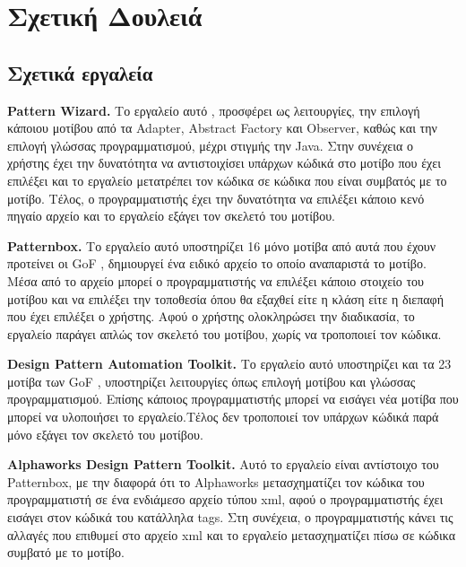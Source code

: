\chapter{Σχετική Δουλειά}
\label{ch:relativeWork}
\section{Σχετικά εργαλεία}
\label{sec:relativeTools}
\textbf{Pattern Wizard.} Το εργαλείο αυτό \cite{PatternBox}, προσφέρει ως λειτουργίες, την επιλογή κάποιου μοτίβου 
από τα Adapter, Abstract Factory και Observer, καθώς και την επιλογή γλώσσας προγραμματισμού, μέχρι στιγμής την Java. Στην συνέχεια 
ο χρήστης έχει την δυνατότητα να αντιστοιχίσει υπάρχων κώδικά στο μοτίβο που έχει επιλέξει και το εργαλείο μετατρέπει τον κώδικα 
σε κώδικα που είναι συμβατός με το μοτίβο. Τέλος, ο προγραμματιστής έχει την δυνατότητα να επιλέξει κάποιο κενό πηγαίο αρχείο και 
το εργαλείο εξάγει τον σκελετό του μοτίβου.
\par
\textbf{Patternbox.} Το εργαλείο αυτό \cite{PatternBox} υποστηρίζει 16 μόνο 
μοτίβα από αυτά που έχουν προτείνει οι GoF \cite{GoF}, δημιουργεί ένα ειδικό 
αρχείο το οποίο αναπαριστά το μοτίβο. Μέσα από το αρχείο μπορεί ο προγραμματιστής 
να επιλέξει κάποιο στοιχείο του μοτίβου και να επιλέξει την τοποθεσία όπου 
θα εξαχθεί είτε η κλάση είτε η διεπαφή που έχει επιλέξει ο χρήστης. 
Αφού ο χρήστης ολοκληρώσει την διαδικασία, 
το εργαλείο παράγει απλώς τον σκελετό του μοτίβου, χωρίς να τροποποιεί τον κώδικα.
\par
\textbf{Design Pattern Automation Toolkit.} Το εργαλείο αυτό \cite{PatternBox} 
υποστηρίζει και τα 23 μοτίβα των GoF \cite{GoF}, υποστηρίζει λειτουργίες 
όπως επιλογή μοτίβου και γλώσσας προγραμματισμού. 
Επίσης κάποιος προγραμματιστής μπορεί να εισάγει νέα μοτίβα που μπορεί 
να υλοποιήσει το εργαλείο.Τέλος δεν τροποποιεί τον υπάρχων κώδικά 
 παρά μόνο εξάγει τον σκελετό του μοτίβου.
\par
\textbf{Alphaworks Design Pattern Toolkit.} Αυτό το εργαλείο \cite{PatternBox} 
είναι αντίστοιχο του Patternbox, με την διαφορά ότι το Alphaworks μετασχηματίζει 
τον κώδικα του προγραμματιστή σε ένα ενδιάμεσο αρχείο τύπου xml, 
αφού ο προγραμματιστής έχει εισάγει στον κώδικά του κατάλληλα tags. 
Στη συνέχεια, ο προγραμματιστής κάνει τις αλλαγές που επιθυμεί στο αρχείο xml 
και το εργαλείο μετασχηματίζει πίσω σε κώδικα συμβατό με το μοτίβο.
